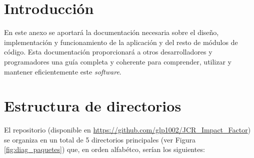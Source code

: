 
\section{Introducción}
En este anexo se aportará la documentación necesaria sobre el diseño, implementación y funcionamiento de la aplicación y del resto de módulos de código. Esta documentación proporcionará a otros desarrolladores y programadores una guía completa y coherente para comprender, utilizar y mantener eficientemente este \textit{software}.

\section{Estructura de directorios}
El repositorio (disponible en \url{https://github.com/glp1002/JCR_Impact_Factor}) se organiza en un total de 5 directorios principales (ver Figura \ref{fig:diag_paquetes}) que, en orden alfabétco, serían los siguientes:

